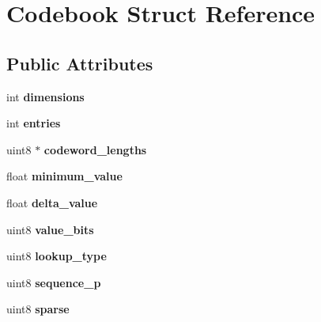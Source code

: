 \hypertarget{struct_codebook}{}\section{Codebook Struct Reference}
\label{struct_codebook}
\subsection*{Public Attributes}
\begin{DoxyCompactItemize}
\item 
int {\bfseries dimensions}\hypertarget{struct_codebook_af2c97899a7fc32b58c0e05d2c357fbd4}{}\label{struct_codebook_af2c97899a7fc32b58c0e05d2c357fbd4}

\item 
int {\bfseries entries}\hypertarget{struct_codebook_a3b75d1bd874ad98d552c15c547d5fc6a}{}\label{struct_codebook_a3b75d1bd874ad98d552c15c547d5fc6a}

\item 
uint8 $\ast$ {\bfseries codeword\+\_\+lengths}\hypertarget{struct_codebook_a5f692a0d4af17c8ea3b085a21b8e3ef9}{}\label{struct_codebook_a5f692a0d4af17c8ea3b085a21b8e3ef9}

\item 
float {\bfseries minimum\+\_\+value}\hypertarget{struct_codebook_a045762c79343b6153ec1978136f1feaa}{}\label{struct_codebook_a045762c79343b6153ec1978136f1feaa}

\item 
float {\bfseries delta\+\_\+value}\hypertarget{struct_codebook_a5f68e4a9acd173f69425233d995c37ed}{}\label{struct_codebook_a5f68e4a9acd173f69425233d995c37ed}

\item 
uint8 {\bfseries value\+\_\+bits}\hypertarget{struct_codebook_a229d0699f42bd26a99b37845aaab75eb}{}\label{struct_codebook_a229d0699f42bd26a99b37845aaab75eb}

\item 
uint8 {\bfseries lookup\+\_\+type}\hypertarget{struct_codebook_addaf4509eb971e141389d6fefe3509c4}{}\label{struct_codebook_addaf4509eb971e141389d6fefe3509c4}

\item 
uint8 {\bfseries sequence\+\_\+p}\hypertarget{struct_codebook_a44cedf17428b52f1df2f62a46c3af880}{}\label{struct_codebook_a44cedf17428b52f1df2f62a46c3af880}

\item 
uint8 {\bfseries sparse}\hypertarget{struct_codebook_ab777487c6199ae81d2384f6acc113cf2}{}\label{struct_codebook_ab777487c6199ae81d2384f6acc113cf2}


\end{DoxyCompactItemize}
